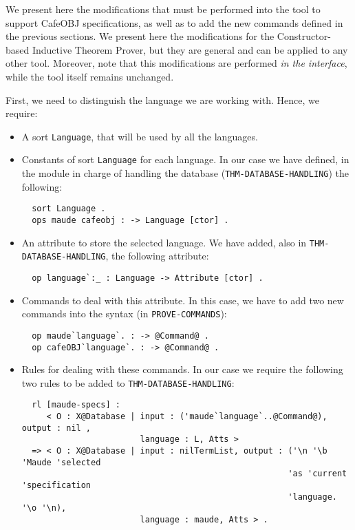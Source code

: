 
We present here the modifications that must be performed into the tool to support
CafeOBJ specifications, as well as to add the new commands defined in the previous
sections. We present here the modifications for the Constructor-based Inductive
Theorem Prover, but they are general and can be applied to any other tool.
%
Moreover, note that this modifications are performed \emph{in the interface},
while the tool itself remains unchanged.

First, we need to distinguish the language we are working with. Hence, we require:
\begin{itemize}
\item
A sort \verb"Language", that will be used by all the languages.

\item
Constants of sort \verb"Language" for each language. In our case we have defined,
in the module in charge of handling the database (\verb"THM-DATABASE-HANDLING")
the following:

{\codesize
\begin{verbatim}
  sort Language .
  ops maude cafeobj : -> Language [ctor] .
\end{verbatim}
}

\item
An attribute to store the selected language. We have added, also in
\texttt{THM-DATABASE-HANDLING}, the following attribute:

{\codesize
\begin{verbatim}
  op language`:_ : Language -> Attribute [ctor] .
\end{verbatim}
}

\item
Commands to deal with this attribute. In this case, we have to add two new
commands into the syntax (in \texttt{PROVE-COMMANDS}):

{\codesize
\begin{verbatim}
  op maude`language`. : -> @Command@ .
  op cafeOBJ`language`. : -> @Command@ .
\end{verbatim}
}

\item
Rules for dealing with these commands. In our case we require the following two
rules to be added to \texttt{THM-DATABASE-HANDLING}:

{\codesize
\begin{verbatim}
  rl [maude-specs] :
     < O : X@Database | input : ('maude`language`..@Command@), output : nil ,
                        language : L, Atts >
  => < O : X@Database | input : nilTermList, output : ('\n '\b 'Maude 'selected
                                                      'as 'current 'specification
                                                      'language. '\o '\n),
                        language : maude, Atts > .


\end{verbatim}}
\end{itemize}

